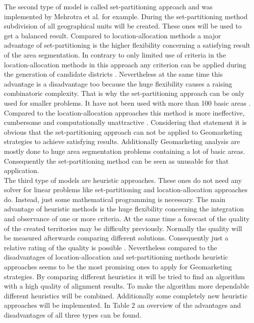 The second type of model is called set-partitioning approach and was implemented by Mehrotra et al. \cite{mehrotra} for example. During the set-partitioning method subdivision of all geographical units will be created. These ones will be used to get a balanced result. Compared to location-allocation methods a major advantage of set-partitioning is the higher flexibility concerning a satisfying result of the area segmentation. In contrary to only limited use of criteria in the location-allocation methods in this approach any criterion can be applied during the generation of candidate districts \cite{kalcsics}. Nevertheless at the same time this advantage is a disadvantage too because the huge flexibility causes a raising combinatoric complexity. That is why the set-partitioning approach can be only used for smaller problems. It have not been used with more than 100 basic areas \cite{kalcsics}. Compared to the location-allocation approaches this method is more ineffective, cumbersome and computationally unattractive \cite{zoltner}. Considering that statement it is obvious that the set-partitioning approach can not be applied to Geomarketing strategies to achieve satisfying results. Additionally Geomarketing analysis are mostly done to huge area segmentation problems containing a lot of basic areas. Consequently the set-partitioning method can be seen as unusable for that application. \\
The third type of models are heuristic approaches. These ones do not need any solver for linear problems like set-partitioning and location-allocation approaches do. Instead, just some mathematical programming is necessary. The main advantage of heuristic methods is the huge flexibility concerning the integration and observance of one or more criteria. At the same time a forecast of the quality of the created territories may be difficulty previously. Normally the quality will be measured afterwards comparing different solutions. Consequently just a relative rating of the quality is possible \cite{schroeder}. Nevertheless compared to the disadvantages of location-allocation and set-partitioning methods heuristic approaches seems to be the most promising ones to apply for Geomarketing strategies. By comparing different heuristics it will be tried to find an algorithm with a high quality of alignment results. To make the algorithm more dependable different heuristics will be combined. Additionally some completely new heuristic approaches will be implemented. In Table 2 an overview of the advantages and disadvantages of all three types can be found.

